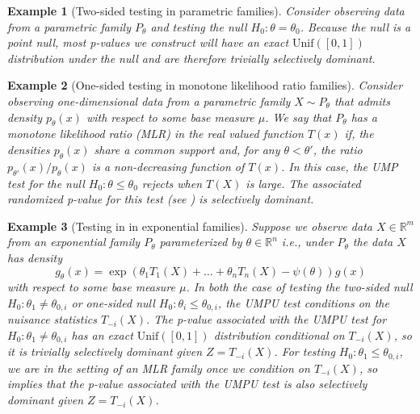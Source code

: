 \documentclass{article}
\newtheorem{example}{Example}
\newcommand{\R}{\mathbb{R}}
\begin{document}
\begin{example}[Two-sided testing in parametric families]
\label{exm:two-sided}
Consider observing data from a parametric family $P_{\theta}$ and testing the null $H_0 : \theta = \theta_0$. Because the null is a point null, most p-values we construct will have an exact $\text{Unif}([0, 1])$ distribution under the null and are therefore trivially selectively dominant. 
\end{example}

\begin{example}[One-sided testing in monotone likelihood ratio families]
\label{exm:mlr}
Consider observing one-dimensional data from a parametric family $X \sim P_{\theta}$ that admits density $p_{\theta}(x)$ with respect to some base measure $\mu$. We say that $P_{\theta}$ has a monotone likelihood ratio (MLR) in the real valued function $T(x)$ if, the densities $p_{\theta}(x)$ share a common support and, for any $\theta < \theta'$, the ratio $p_{\theta'}(x)/p_{\theta}(x)$ is a non-decreasing function of $T(x)$. In this case, the UMP test for the null $H_0: \theta \leq \theta_0$ rejects when $T(X)$ is large. The associated randomized p-value for this test (see ) is selectively dominant. 
\end{example}

\begin{example}[Testing in in exponential families]
\label{exm:exp_fam}
Suppose we observe data $X \in \R^m$ from an exponential family $P_{\theta}$ parameterized by $\theta \in \R^n$ i.e., under $P_{\theta}$ the data $X$ has density  
\begin{equation*}
    g_{\theta}(x) = \exp( \theta_1 T_1(X) + \dots + \theta_n T_n(X) - \psi(\theta) ) g(x) 
\end{equation*}
with respect to some base measure $\mu$. In both the case of testing the two-sided null $H_0: \theta_1 \neq \theta_{0, i}$ or one-sided null $H_0: \theta_i \leq \theta_{0, i}$, the UMPU test conditions on the nuisance statistics $T_{-i}(X)$. The p-value associated with the UMPU test for $H_0: \theta_1 \neq \theta_{0, i}$ has an exact $\text{Unif}([0, 1])$ distribution conditional on $T_{-i}(X)$, so it is trivially selectively dominant given $Z = T_{-i}(X)$. For testing $H_0: \theta_1 \leq \theta_{0, i}$, we are in the setting of an MLR family once we condition on $T_{-i}(X)$, so  implies that the p-value associated with the UMPU test is also selectively dominant given $Z = T_{-i}(X)$.
\end{example}
\end{document}
